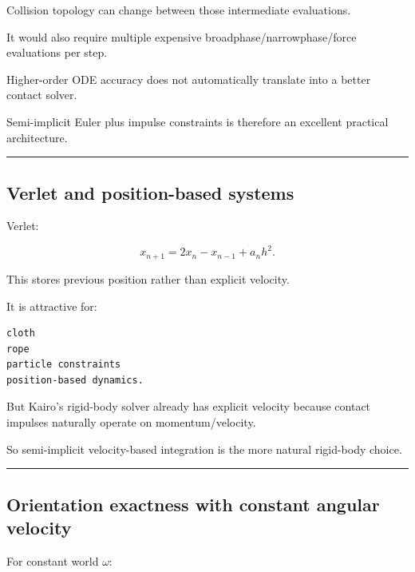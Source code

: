 Collision topology can change between those intermediate evaluations.

It would also require multiple expensive broadphase/narrowphase/force evaluations per step.

Higher-order ODE accuracy does not automatically translate into a better contact solver.

Semi-implicit Euler plus impulse constraints is therefore an excellent practical architecture.

\begin{center}\rule{0.5\linewidth}{0.5pt}\end{center}

\subsection{Verlet and position-based systems}\label{06-engine-ii-ch038-verlet-and-position-based-systems}

\hypertarget{06-engine-ii-ch038-verlet-and-position-based-systems}{}

Verlet:

\[
x_{n+1}
=
2x_n-x_{n-1}+a_nh^2.
\]

This stores previous position rather than explicit velocity.

It is attractive for:

\begin{verbatim}
cloth
rope
particle constraints
position-based dynamics.
\end{verbatim}

But Kairo's rigid-body solver already has explicit velocity because contact impulses naturally operate on momentum/velocity.

So semi-implicit velocity-based integration is the more natural rigid-body choice.

\begin{center}\rule{0.5\linewidth}{0.5pt}\end{center}

\subsection{Orientation exactness with constant angular velocity}\label{06-engine-ii-ch038-orientation-exactness-with-constant-angular-velocity}

\hypertarget{06-engine-ii-ch038-orientation-exactness-with-constant-angular-velocity}{}

For constant world \(\omega\):

